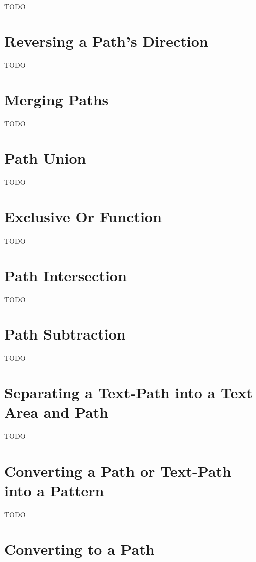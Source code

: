 TODO


\section{Reversing a Path's Direction}\label{sec:reversing}

TODO


\section{Merging Paths}\label{sec:mergepaths}

TODO


\section{Path Union}\label{sec:pathunion}

TODO


\section{Exclusive Or Function}\label{sec:xorpath}

TODO


\section{Path Intersection}\label{sec:pathintersect}

TODO


\section{Path Subtraction}\label{sec:pathsubtract}

TODO


\section{Separating a Text-Path into a Text Area and Path}\label{sec:separate}

TODO


\section{Converting a Path or Text-Path into a Pattern}\label{sec:patterns}

TODO


\section{Converting to a Path}\label{sec:converttopath}

